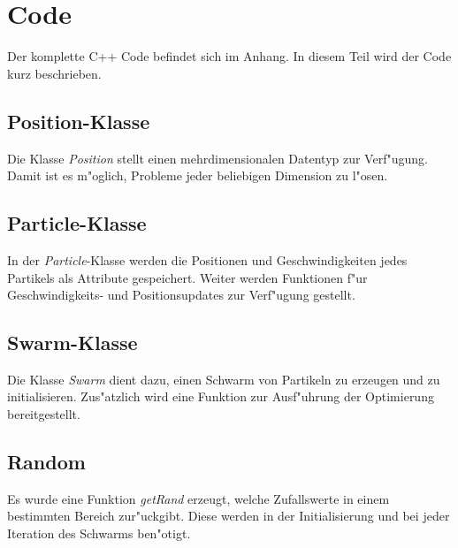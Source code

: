 \section{Code}
Der komplette C++ Code befindet sich im Anhang. In diesem Teil wird der
Code kurz beschrieben.

\subsection{Position-Klasse}
Die Klasse \textit{Position} stellt einen mehrdimensionalen Datentyp
zur Verf"ugung.
Damit ist es m"oglich, Probleme jeder beliebigen Dimension zu l"osen.

\subsection{Particle-Klasse}
In der \textit{Particle}-Klasse werden die Positionen und
Geschwindigkeiten jedes Partikels
als Attribute gespeichert. Weiter werden Funktionen f"ur Geschwindigkeits-
und Positionsupdates
zur Verf"ugung gestellt.

\subsection{Swarm-Klasse}
Die Klasse \textit{Swarm} dient dazu, einen Schwarm von Partikeln zu
erzeugen und zu initialisieren.
Zus"atzlich wird eine Funktion zur Ausf"uhrung der Optimierung bereitgestellt.

\subsection{Random}
Es wurde eine Funktion \textit{getRand} erzeugt, welche Zufallswerte in
einem bestimmten Bereich zur"uckgibt. Diese werden in der Initialisierung
und bei jeder Iteration des Schwarms ben"otigt.
